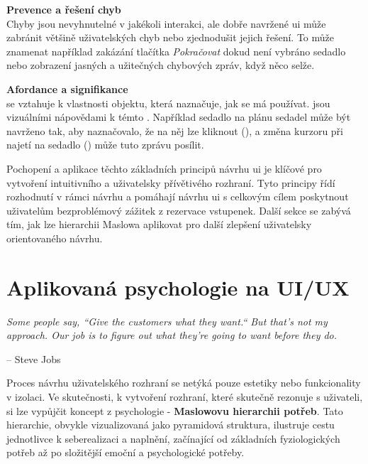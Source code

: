 \textbf{Prevence a řešení chyb}\\
Chyby jsou nevyhnutelné v jakékoli interakci, ale dobře navržené \ac{ui} může zabránit většině uživatelských chyb nebo zjednodušit jejich řešení.
To může znamenat například zakázání tlačítka \textit{Pokračovat} dokud není vybráno sedadlo nebo zobrazení jasných a užitečných chybových zpráv, když něco selže.

\textbf{Afordance a signifikance}\\
 se vztahuje k vlastnosti objektu, která naznačuje, jak se má používat.
 jsou vizuálními nápovědami k témto .
Například sedadlo na plánu sedadel může být navrženo tak, aby naznačovalo, že na něj lze kliknout (), a změna kurzoru při najetí na sedadlo () může tuto zprávu posílit.

Pochopení a aplikace těchto základních principů návrhu \ac{ui} je klíčové pro vytvoření intuitivního a uživatelsky přívětivého rozhraní.
Tyto principy řídí rozhodnutí v rámci návrhu a pomáhají návrhu \ac{ui} s celkovým cílem poskytnout uživatelům bezproblémový zážitek z rezervace vstupenek.
Další sekce se zabývá tím, jak lze hierarchii Maslowa aplikovat pro další zlepšení uživatelsky orientovaného návrhu.

\section{Aplikovaná psychologie na UI/UX}
\label{sec:navrh-psychologie}

\setlength{}
\epigraph{\textit{Some people say, ``Give the customers what they want.`` But that's not my approach. Our job is to figure out what they're going to want before they do.}}{-- Steve Jobs}

Proces návrhu uživatelského rozhraní se netýká pouze estetiky nebo funkcionality v izolaci.
Ve skutečnosti, k vytvoření rozhraní, které skutečně rezonuje s uživateli, si lze vypůjčit koncept z psychologie - \textbf{Maslowovu hierarchii potřeb}.
Tato hierarchie, obvykle vizualizovaná jako pyramidová struktura, ilustruje cestu jednotlivce k seberealizaci a naplnění, začínající od základních fyziologických potřeb až po složitější emoční a psychologické potřeby.


